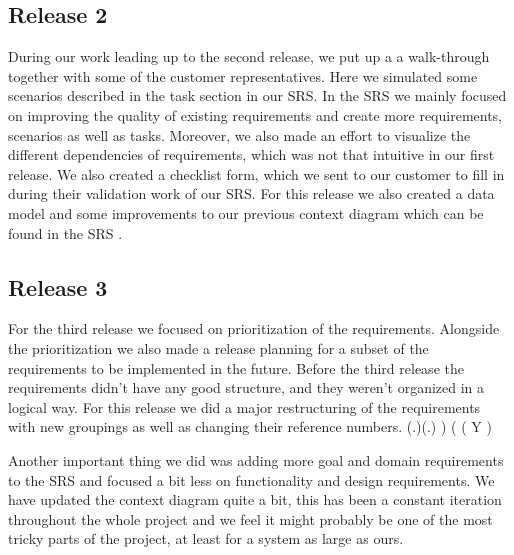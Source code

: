 \documentclass[10pt]{article}
\begin{document}
\subsection{Release 2}
During our work leading up to the second release, we put up a a walk-through together with some of the customer representatives. Here we simulated some scenarios described in the task section in our SRS. In the SRS we mainly focused on improving the quality of existing requirements and create more requirements, scenarios as well as tasks. Moreover, we also made an effort to visualize the different dependencies of requirements, which was not that intuitive in our first release. We also created a checklist form, which we sent to our customer to fill in during their validation work of our SRS. 
For this release we also created a data model and some improvements to our previous context diagram which can be found in the SRS \cite{srs}.

\subsection{Release 3}
For the third  release we focused on prioritization of the requirements. Alongside the prioritization we also made a release planning for a subset of the requirements to be implemented in the future.
Before the third release the requirements didn't have any good structure, and they weren't organized in a logical way. For this release we did a major restructuring of the requirements with new groupings as well as changing their reference numbers.
(.)(.)
 )  (
( Y  )


Another important thing we did was adding more goal and domain requirements to the SRS and focused a bit less on functionality and design requirements. 
We have updated the context diagram quite a bit, this has been a constant iteration throughout the whole project and we feel it might probably be one of the most tricky parts of the project, at least for a system as large as ours.
\end{document}
